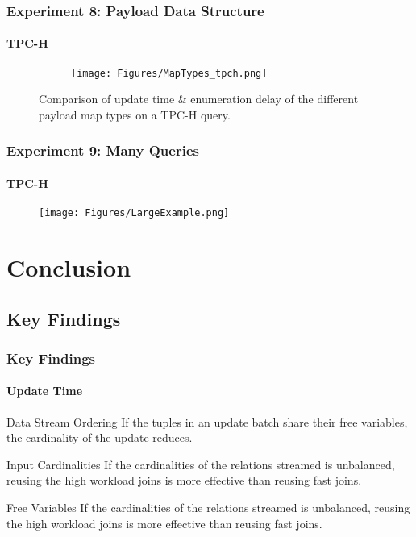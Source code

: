 \documentclass[
	11pt, %
]{beamer}
\begin{document}
\begin{frame}
	\frametitle{Experiment 8: Payload Data Structure}
	\framesubtitle{TPC-H}
	\begin{figure}
		\begin{minipage}{0.25\textwidth}
		\end{minipage}
		\begin{minipage}{0.74\textwidth}
			\begin{figure}
				\centering
				\texttt{[image: Figures/MapTypes\_tpch.png]}
			\end{figure}
		\end{minipage}
		\caption{Comparison of update time \& enumeration delay of the different payload map types on a TPC-H query.}
	\end{figure}
\end{frame}


\begin{frame}
	\frametitle{Experiment 9: Many Queries}
	\framesubtitle{TPC-H}
	\begin{figure}
		\centering
		\texttt{[image: Figures/LargeExample.png]}
	\end{figure}
\end{frame}

\section{Conclusion}
\subsection{Key Findings}
\begin{frame}
	\frametitle{Key Findings}
	\framesubtitle{Update Time}
	\begin{block}{Data Stream Ordering}
		If the tuples in an update batch share their free variables, the cardinality of the update reduces.
	\end{block}
	\begin{block}{Input Cardinalities}
		If the cardinalities of the relations streamed is unbalanced, reusing the high workload joins is more effective than reusing fast joins.
	\end{block}
	\begin{block}{Free Variables}
		If the cardinalities of the relations streamed is unbalanced, reusing the high workload joins is more effective than reusing fast joins.
	\end{block}
\end{frame}
\end{document}
